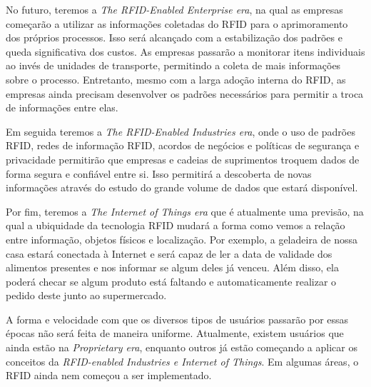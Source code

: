 \documentclass[a4paper,12pt,titlepage]{article}
\begin{document}
	No futuro, teremos a \textit{The RFID-Enabled Enterprise era}, na qual as empresas começarão a utilizar as informações coletadas do RFID para o aprimoramento dos próprios processos. Isso será alcançado com a estabilização dos padrões e queda significativa dos custos. As empresas passarão a monitorar itens individuais ao invés de unidades de transporte, permitindo a coleta de mais informações sobre o processo. Entretanto, mesmo com a larga adoção interna do RFID, as empresas ainda precisam desenvolver os padrões necessários para permitir a troca de informações entre elas. 
	
	Em seguida teremos a \textit{The RFID-Enabled Industries era}, onde o uso de padrões RFID, redes de informação RFID, acordos de negócios e políticas de segurança e privacidade permitirão que empresas e cadeias de suprimentos troquem dados de forma segura e confiável entre si. Isso permitirá a descoberta de novas informações através do estudo  do grande volume de dados que estará disponível.   
	   
	Por fim, teremos a \textit{The Internet of Things era} que é atualmente uma previsão, na qual a ubiquidade da tecnologia RFID mudará a forma como vemos a relação entre informação, objetos físicos e localização. Por exemplo, a geladeira de nossa casa estará conectada à Internet e será capaz de ler a data de validade dos alimentos presentes e nos informar se algum deles já venceu. Além disso, ela poderá checar se algum produto está faltando e automaticamente realizar o pedido deste junto ao supermercado.
	
	A forma e velocidade com que os diversos tipos de usuários passarão por essas épocas não será feita de maneira uniforme. Atualmente, existem usuários que ainda estão na \textit{Proprietary era}, enquanto outros já estão começando a aplicar os conceitos da \textit{RFID-enabled Industries e Internet of Things}. Em algumas áreas, o RFID ainda nem começou a ser implementado.
	
	
	
	
	\newpage
	 
	 \nocite{*}
	 
	 
\end{document}
